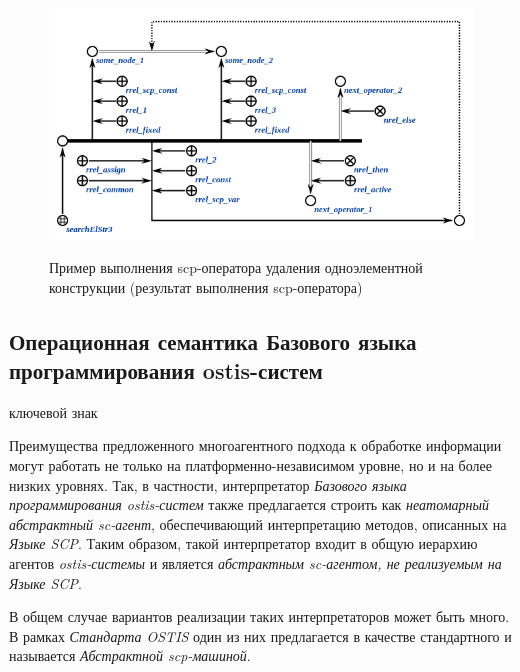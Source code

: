 \begin{figure}[H]
	\centering
	\caption{Пример выполнения scp-оператора удаления одноэлементной конструкции (результат выполнения scp-оператора)}
	\includegraphics[scale=0.8]{images/part3/chapter_situation_management/searchElStr3_faf_2.png}
	\label{fig:erase_edge_2}
\end{figure}

\subsection{Операционная семантика Базового языка программирования ostis-систем}
\label{subsec_scp_oper}

\begin{SCn}
\begin{scnrelfromlist}{ключевой знак}
\end{scnrelfromlist}
\end{SCn}

Преимущества предложенного многоагентного подхода к обработке информации могут работать не только на платформенно-независимом уровне, но и на более низких уровнях. Так, в частности, интерпретатор \textit{Базового языка программирования ostis-систем} также предлагается строить как \textit{неатомарный абстрактный sc-агент}, обеспечивающий интерпретацию методов, описанных на \textit{Языке SCP}. Таким образом, такой интерпретатор входит в общую иерархию агентов \textit{ostis-системы} и является \textit{абстрактным sc-агентом, не реализуемым на Языке SCP}.

В общем случае вариантов реализации таких интерпретаторов может быть много. В рамках \textit{Стандарта OSTIS} один из них предлагается в качестве стандартного и называется \textit{Абстрактной scp-машиной}.

